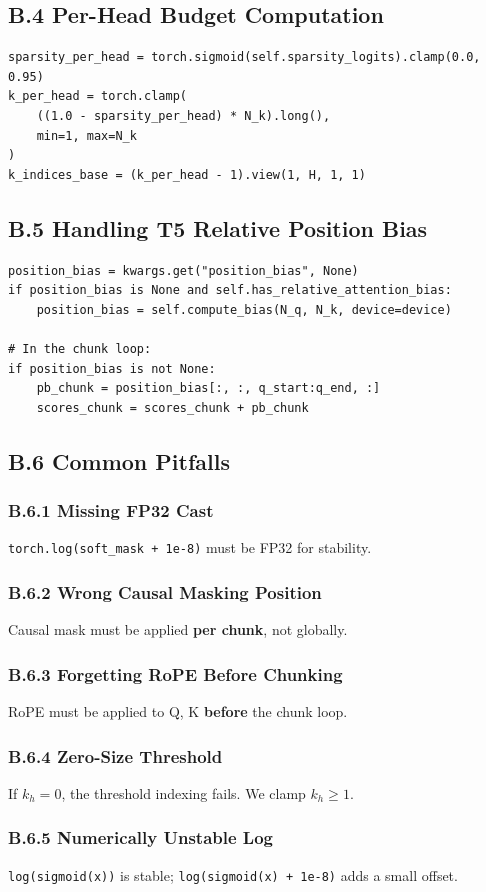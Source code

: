 \subsection{B.4 Per-Head Budget Computation}

\begin{lstlisting}
sparsity_per_head = torch.sigmoid(self.sparsity_logits).clamp(0.0, 0.95)
k_per_head = torch.clamp(
    ((1.0 - sparsity_per_head) * N_k).long(),
    min=1, max=N_k
)
k_indices_base = (k_per_head - 1).view(1, H, 1, 1)
\end{lstlisting}

\subsection{B.5 Handling T5 Relative Position Bias}

\begin{lstlisting}
position_bias = kwargs.get("position_bias", None)
if position_bias is None and self.has_relative_attention_bias:
    position_bias = self.compute_bias(N_q, N_k, device=device)

# In the chunk loop:
if position_bias is not None:
    pb_chunk = position_bias[:, :, q_start:q_end, :]
    scores_chunk = scores_chunk + pb_chunk
\end{lstlisting}

\subsection{B.6 Common Pitfalls}

\subsubsection{B.6.1 Missing FP32 Cast}

\texttt{torch.log(soft\_mask + 1e-8)} must be FP32 for stability.

\subsubsection{B.6.2 Wrong Causal Masking Position}

Causal mask must be applied \textbf{per chunk}, not globally.

\subsubsection{B.6.3 Forgetting RoPE Before Chunking}

RoPE must be applied to Q, K \textbf{before} the chunk loop.

\subsubsection{B.6.4 Zero-Size Threshold}

If $k_h = 0$, the threshold indexing fails. We clamp $k_h \ge 1$.

\subsubsection{B.6.5 Numerically Unstable Log}

\texttt{log(sigmoid(x))} is stable; \texttt{log(sigmoid(x) + 1e-8)} adds a small offset.